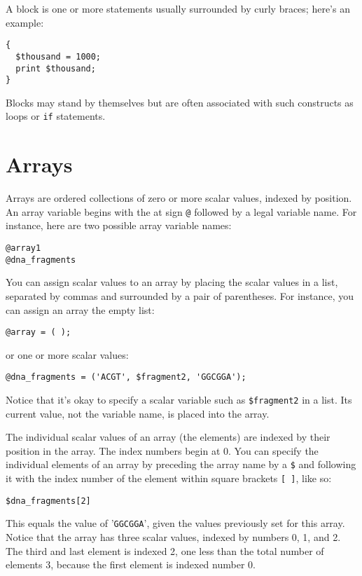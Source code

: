 A block is one or more statements usually surrounded by curly braces;
here's an example:

\begin{lstlisting}
{
  $thousand = 1000;
  print $thousand;
}
\end{lstlisting}

Blocks may stand by themselves but are often associated with such constructs as loops or \verb|if| statements.

\section{Arrays}
Arrays are ordered collections of zero or more scalar values, indexed by position. An array variable begins with the at sign \verb|@| followed by a legal variable name. For instance, here are two possible array variable names:

\begin{lstlisting}
@array1
@dna_fragments
\end{lstlisting}

You can assign scalar values to an array by placing the scalar values in a list, separated by commas and surrounded by a pair of parentheses. For instance, you can assign an array the empty list:

\begin{lstlisting}
@array = ( );
\end{lstlisting}

or one or more scalar values:

\begin{lstlisting}
@dna_fragments = ('ACGT', $fragment2, 'GGCGGA');
\end{lstlisting}

Notice that it's okay to specify a scalar variable such as \verb|$fragment2| in a list. Its current value, not the variable name, is placed into the array.

The individual scalar values of an array (the elements) are indexed by their position in the array. The index numbers begin at 0. You can specify the individual elements of an array by preceding the array name by a \verb|$| and following it with the index number of the element within square brackets \verb|[ ]|, like so:

\begin{lstlisting}
$dna_fragments[2]
\end{lstlisting}

This equals the value of '\verb|GGCGGA|', given the values previously set for this array. Notice that the array has three scalar values, indexed by numbers 0, 1, and 2. The third and last element is indexed 2, one less than the total number of elements 3, because the first element is indexed number 0.

